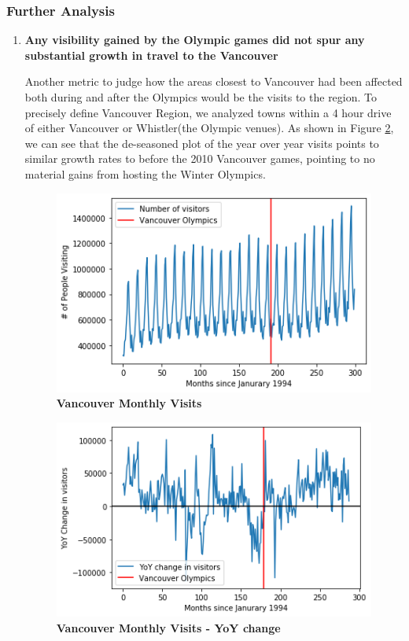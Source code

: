 \documentclass[11pt, twocolumn]{article}
\begin{document}
\subsubsection{Further Analysis}  
\begin{enumerate}
    \item \textbf{Any visibility gained by the Olympic games did not spur any substantial growth in travel to the Vancouver }
    
    Another metric to judge how the areas closest to Vancouver had been affected both during and after the Olympics would be the visits to the region. To precisely define Vancouver Region, we analyzed towns within a 4 hour drive of either Vancouver or Whistler(the Olympic venues). As shown in Figure \ref{fig:Vancouver_Monthly_YoY}, we can see that the de-seasoned plot of the year over year visits points to similar growth rates to before the 2010 Vancouver games, pointing to no material gains from hosting the Winter Olympics. 
    
    \begin{figure}[H]
        \centering
            \includegraphics[scale=0.6]{Vancouver_Monthly_Visitors.png}
        \caption{\textbf{Vancouver Monthly Visits}}
        \label{fig:Vancouver_Monthly}
    \end{figure}
    
    \begin{figure}[H]
        \centering
            \includegraphics[scale=0.6]{Vancouver_Monthly_Visitors_YoY.png}
        \caption{\textbf{Vancouver Monthly Visits - YoY change}}
        \label{fig:Vancouver_Monthly_YoY}
    \end{figure}
    

\end{enumerate}
\end{document}
